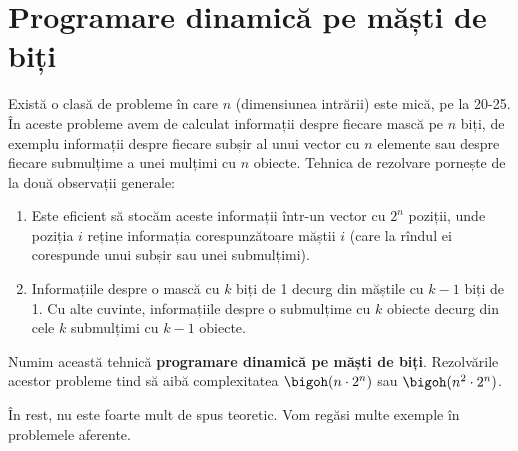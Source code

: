 \section{Programare dinamică pe măști de biți}

Există o clasă de probleme în care $n$ (dimensiunea intrării) este mică, pe la 20-25. În aceste probleme avem de calculat informații despre fiecare mască pe $n$ biți, de exemplu informații despre fiecare subșir al unui vector cu $n$ elemente sau despre fiecare submulțime a unei mulțimi cu $n$ obiecte. Tehnica de rezolvare pornește de la două observații generale:

\begin{enumerate}
  \item Este eficient să stocăm aceste informații într-un vector cu $2^n$ poziții, unde poziția $i$ reține informația corespunzătoare măștii $i$ (care la rîndul ei corespunde unui subșir sau unei submulțimi).
  \item Informațiile despre o mască cu $k$ biți de 1 decurg din măștile cu $k-1$ biți de 1. Cu alte cuvinte, informațiile despre o submulțime cu $k$ obiecte decurg din cele $k$ submulțimi cu $k-1$ obiecte.
\end{enumerate}

Numim această tehnică \textbf{programare dinamică pe măști de biți}. Rezolvările acestor probleme tind să aibă complexitatea $\bigoh(n \cdot 2^n)$ sau $\bigoh(n^2 \cdot 2^n)$.

În rest, nu este foarte mult de spus teoretic. Vom regăsi multe exemple în problemele aferente.
